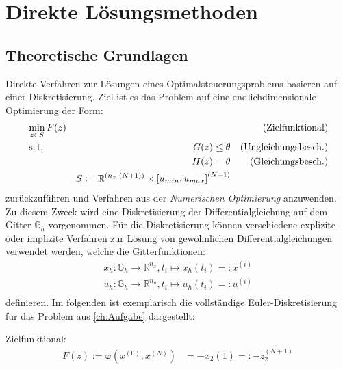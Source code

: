 \chapter{Direkte Lösungsmethoden} \label{ch:DirectMehtods}
\section{Theoretische Grundlagen}
Direkte Verfahren zur Lösungen eines Optimalsteuerungsproblems basieren auf einer Diskretisierung. Ziel ist es das Problem auf eine endlichdimensionale Optimierung der Form:
\begin{align}
 	&\min_{z \in S}  F(z) &&& \text{(Zielfunktional)}\\
 					&\operatorname{s.t.} &G(z) \leq \theta  && \text{(Ungleichungsbesch.)}\nonumber \\
 					&&H(z) = \theta&& \text{(Gleichungsbesch.)} \nonumber \\
 					&&S := \mathbb{R}^{(n_x\cdot(N+1))} \times \left[ u_{min}, u_{max}\right]^{(N+1)}\nonumber
\end{align}
zurückzuführen und Verfahren aus der \textit{Numerischen Optimierung} anzuwenden. Zu diesem Zweck wird eine Diskretisierung der Differentialgleichung auf dem Gitter $\mathbb{G}_h$ vorgenommen. Für die Diskretisierung können verschiedene explizite oder implizite Verfahren zur Lösung von gewöhnlichen Differentialgleichungen verwendet werden, welche die Gitterfunktionen:
\begin{align}
	x_h: \mathbb{G}_h \rightarrow \mathbb{R}^{n_x}, t_i \mapsto x_h(t_i) =: x^{(i)}\\
	u_h: \mathbb{G}_h \rightarrow \mathbb{R}^{n_u}, t_i \mapsto u_h(t_i) =: u^{(i)}\\
\end{align}
 definieren. \cite{NumSkript} Im folgenden ist exemplarisch die vollständige Euler-Diskretisierung für das Problem aus \autoref{ch:Aufgabe} dargestellt:

Zielfunktional:
\begin{align}
	F(z):=\varphi(x^{(0)},x^{(N)}) &= -x_2(1)	=: -z_2^{(N+1)}
\end{align}

